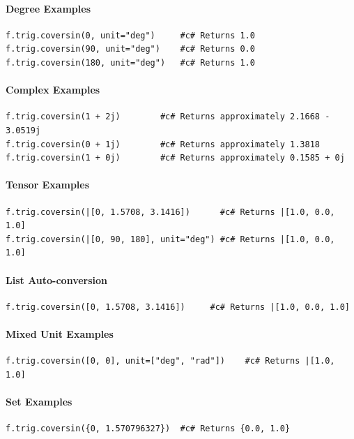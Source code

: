 \paragraph{Degree Examples}
\begin{verbatim}
f.trig.coversin(0, unit="deg")     #c# Returns 1.0
f.trig.coversin(90, unit="deg")    #c# Returns 0.0
f.trig.coversin(180, unit="deg")   #c# Returns 1.0
\end{verbatim}

\paragraph{Complex Examples}
\begin{verbatim}
f.trig.coversin(1 + 2j)        #c# Returns approximately 2.1668 - 3.0519j
f.trig.coversin(0 + 1j)        #c# Returns approximately 1.3818
f.trig.coversin(1 + 0j)        #c# Returns approximately 0.1585 + 0j
\end{verbatim}

\paragraph{Tensor Examples}
\begin{verbatim}
f.trig.coversin(|[0, 1.5708, 3.1416])      #c# Returns |[1.0, 0.0, 1.0]
f.trig.coversin(|[0, 90, 180], unit="deg") #c# Returns |[1.0, 0.0, 1.0]
\end{verbatim}

\paragraph{List Auto-conversion}
\begin{verbatim}
f.trig.coversin([0, 1.5708, 3.1416])     #c# Returns |[1.0, 0.0, 1.0]
\end{verbatim}

\paragraph{Mixed Unit Examples}
\begin{verbatim}
f.trig.coversin([0, 0], unit=["deg", "rad"])    #c# Returns |[1.0, 1.0]
\end{verbatim}

\paragraph{Set Examples}
\begin{verbatim}
f.trig.coversin({0, 1.570796327})  #c# Returns {0.0, 1.0}
\end{verbatim}

